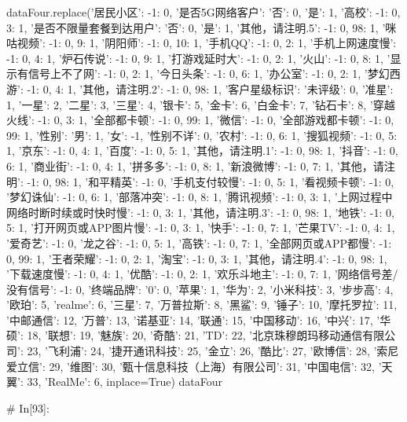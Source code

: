 \documentclass{MathorCupmodeling}
\begin{document}
\begin{python}
	
	dataFour.replace({'居民小区': {-1: 0}, '是否5G网络客户': {'否': 0, '是': 1}, '高校': {-1: 0, 3: 1}, '是否不限量套餐到达用户': {'否': 0, '是': 1}, '其他，请注明.5': {-1: 0, 98: 1}, '咪咕视频': {-1: 0, 9: 1}, '阴阳师': {-1: 0, 10: 1}, '手机QQ': {-1: 0, 2: 1}, '手机上网速度慢': {-1: 0, 4: 1}, '炉石传说': {-1: 0, 9: 1}, '打游戏延时大': {-1: 0, 2: 1}, '火山': {-1: 0, 8: 1}, '显示有信号上不了网': {-1: 0, 2: 1}, '今日头条': {-1: 0, 6: 1}, '办公室': {-1: 0, 2: 1}, '梦幻西游': {-1: 0, 4: 1}, '其他，请注明.2': {-1: 0, 98: 1}, '客户星级标识': {'未评级': 0, '准星': 1, '一星': 2, '二星': 3, '三星': 4, '银卡': 5, '金卡': 6, '白金卡': 7, '钻石卡': 8}, '穿越火线': {-1: 0, 3: 1}, '全部都卡顿': {-1: 0, 99: 1}, '微信': {-1: 0}, '全部游戏都卡顿': {-1: 0, 99: 1}, '性别': {'男': 1, '女': -1, '性别不详': 0}, '农村': {-1: 0, 6: 1}, '搜狐视频': {-1: 0, 5: 1}, '京东': {-1: 0, 4: 1}, '百度': {-1: 0, 5: 1}, '其他，请注明.1': {-1: 0, 98: 1}, '抖音': {-1: 0, 6: 1}, '商业街': {-1: 0, 4: 1}, '拼多多': {-1: 0, 8: 1}, '新浪微博': {-1: 0, 7: 1}, '其他，请注明': {-1: 0, 98: 1}, '和平精英': {-1: 0}, '手机支付较慢': {-1: 0, 5: 1}, '看视频卡顿': {-1: 0}, '梦幻诛仙': {-1: 0, 6: 1}, '部落冲突': {-1: 0, 8: 1}, '腾讯视频': {-1: 0, 3: 1}, '上网过程中网络时断时续或时快时慢': {-1: 0, 3: 1}, '其他，请注明.3': {-1: 0, 98: 1}, '地铁': {-1: 0, 5: 1}, '打开网页或APP图片慢': {-1: 0, 3: 1}, '快手': {-1: 0, 7: 1}, '芒果TV': {-1: 0, 4: 1}, '爱奇艺': {-1: 0}, '龙之谷': {-1: 0, 5: 1}, '高铁': {-1: 0, 7: 1}, '全部网页或APP都慢': {-1: 0, 99: 1}, '王者荣耀': {-1: 0, 2: 1}, '淘宝': {-1: 0, 3: 1}, '其他，请注明.4': {-1: 0, 98: 1}, '下载速度慢': {-1: 0, 4: 1}, '优酷': {-1: 0, 2: 1}, '欢乐斗地主': {-1: 0, 7: 1}, '网络信号差/没有信号': {-1: 0}, '终端品牌': {'0': 0, '苹果': 1, '华为': 2, '小米科技': 3, '步步高': 4, '欧珀': 5, 'realme': 6, '三星': 7, '万普拉斯': 8, '黑鲨': 9, '锤子': 10, '摩托罗拉': 11, '中邮通信': 12, '万普': 13, '诺基亚': 14, '联通': 15, '中国移动': 16, '中兴': 17, '华硕': 18, '联想': 19, '魅族': 20, '奇酷': 21, 'TD': 22, '北京珠穆朗玛移动通信有限公司': 23, '飞利浦': 24, '捷开通讯科技': 25, '金立': 26, '酷比': 27, '欧博信': 28, '索尼爱立信': 29, '维图': 30, '甄十信息科技（上海）有限公司': 31, '中国电信': 32, '天翼': 33, 'RealMe': 6}}, inplace=True)
	dataFour
	
	# In[93]:
	

\end{python}
\end{document}
